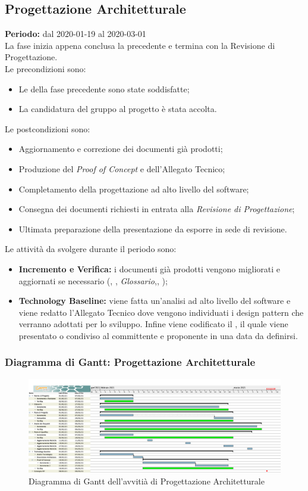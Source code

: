 \subsection{Progettazione Architetturale}
\label{progettazione_architetturale}
\textbf{Periodo:} dal 2020-01-19 al 2020-03-01
\\La fase inizia appena conclusa la precedente e termina con la Revisione di Progettazione.
\\Le precondizioni sono:

\begin{itemize}
    \item Le  della fase precedente sono state soddisfatte;
    \item La candidatura del gruppo al progetto {\NomeProgetto} è stata accolta.
\end{itemize}
    Le postcondizioni sono:
\begin{itemize}
    \item Aggiornamento e correzione dei documenti già prodotti;
    \item Produzione del \textit{Proof of Concept} e dell'Allegato Tecnico;
    \item Completamento della progettazione ad alto livello del software;
    \item Consegna dei documenti richiesti in entrata alla \textit{Revisione di Progettazione};
    \item Ultimata preparazione della presentazione da esporre in sede di revisione.
\end{itemize}

Le attività da svolgere durante il periodo sono:
\begin{itemize}
    \item \textbf{Incremento e Verifica:} i documenti già prodotti vengono migliorati e aggiornati se necessario (\textit{\NdP}, \textit{\PdP}, \textit{Glossario},\textit{\PdQ}, \textit{\AdR});
    \item \textbf{Technology Baseline:} viene fatta un'analisi ad alto livello del software e viene redatto l'Allegato Tecnico dove vengono individuati i design pattern che verranno adottati per lo sviluppo. Infine viene codificato il , il quale viene presentato o condiviso al committente e proponente in una data da definirsi.
\end{itemize}

\newpage
\subsubsection{Diagramma di Gantt: Progettazione Architetturale}

\begin{figure}[ht]
    \centering
    \includegraphics[width=\textwidth]{../../Immagini/GanttProgettazioneArchitetturale}
    \caption{Diagramma di Gantt dell'avvitià di Progettazione Architetturale}
\end{figure}